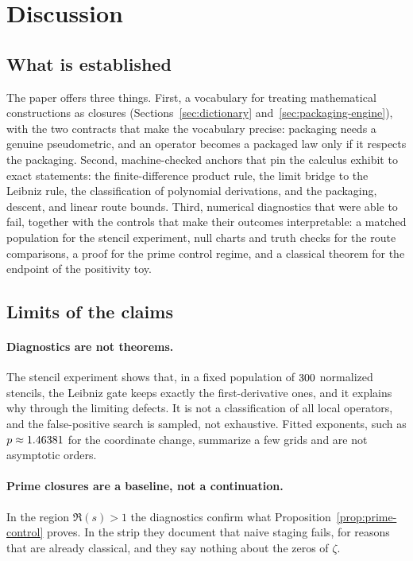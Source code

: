 \section{Discussion}
\label{sec:discussion}

\subsection{What is established}
The paper offers three things.
First, a vocabulary for treating mathematical constructions as closures (Sections~\ref{sec:dictionary} and~\ref{sec:packaging-engine}), with the two contracts that make the vocabulary precise: packaging needs a genuine pseudometric, and an operator becomes a packaged law only if it respects the packaging.
Second, machine-checked anchors that pin the calculus exhibit to exact statements: the finite-difference product rule, the limit bridge to the Leibniz rule, the classification of polynomial derivations, and the packaging, descent, and linear route bounds.
Third, numerical diagnostics that were able to fail, together with the controls that make their outcomes interpretable: a matched population for the stencil experiment, null charts and truth checks for the route comparisons, a proof for the prime control regime, and a classical theorem for the endpoint of the positivity toy.

\subsection{Limits of the claims}
\paragraph{Diagnostics are not theorems.}
The stencil experiment shows that, in a fixed population of $300$ normalized stencils, the Leibniz gate keeps exactly the first-derivative ones, and it explains why through the limiting defects.
It is not a classification of all local operators, and the false-positive search is sampled, not exhaustive.
Fitted exponents, such as $p\approx1.46381$ for the coordinate change, summarize a few grids and are not asymptotic orders.

\paragraph{Prime closures are a baseline, not a continuation.}
In the region $\Re(s)>1$ the diagnostics confirm what Proposition~\ref{prop:prime-control} proves.
In the strip they document that naive staging fails, for reasons that are already classical, and they say nothing about the zeros of $\zeta$.

